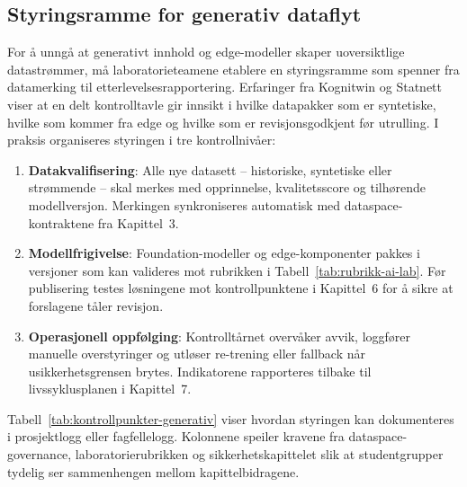 \subsection{Styringsramme for generativ dataflyt}
For å unngå at generativt innhold og edge-modeller skaper uoversiktlige datastrømmer, må laboratorieteamene etablere en styringsramme som spenner fra datamerking til etterlevelsesrapportering. Erfaringer fra Kognitwin og Statnett viser at en delt kontrolltavle gir innsikt i hvilke datapakker som er syntetiske, hvilke som kommer fra edge og hvilke som er revisjonsgodkjent før utrulling.\citep{kongsberg2023kognitwin,statnett2023digital} I praksis organiseres styringen i tre kontrollnivåer:
\begin{enumerate}
    \item \textbf{Datakvalifisering}: Alle nye datasett -- historiske, syntetiske eller strømmende -- skal merkes med opprinnelse, kvalitetsscore og tilhørende modellversjon. Merkingen synkroniseres automatisk med dataspace-kontraktene fra Kapittel~3.
    \item \textbf{Modellfrigivelse}: Foundation-modeller og edge-komponenter pakkes i versjoner som kan valideres mot rubrikken i Tabell~\ref{tab:rubrikk-ai-lab}. Før publisering testes løsningene mot kontrollpunktene i Kapittel~6 for å sikre at forslagene tåler revisjon.
    \item \textbf{Operasjonell oppfølging}: Kontrolltårnet overvåker avvik, loggfører manuelle overstyringer og utløser re-trening eller fallback når usikkerhetsgrensen brytes. Indikatorene rapporteres tilbake til livssyklusplanen i Kapittel~7.
\end{enumerate}

Tabell~\ref{tab:kontrollpunkter-generativ} viser hvordan styringen kan dokumenteres i prosjektlogg eller fagfellelogg. Kolonnene speiler kravene fra dataspace-governance, laboratorierubrikken og sikkerhetskapittelet slik at studentgrupper tydelig ser sammenhengen mellom kapittelbidragene.

